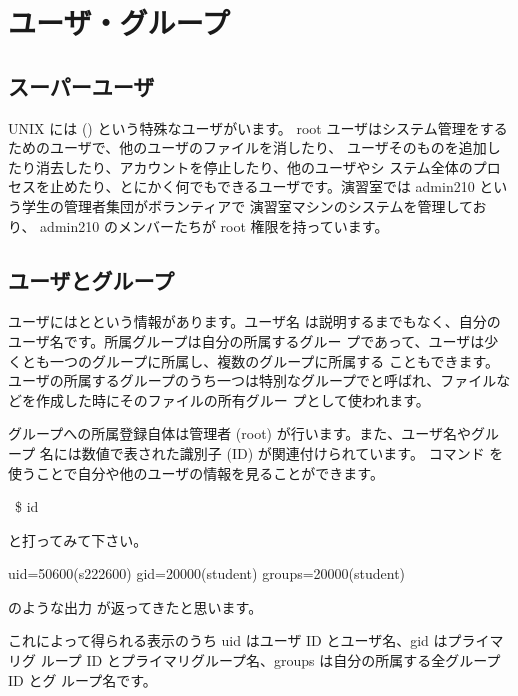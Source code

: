 \documentclass[platex]{jsarticle}
\begin{document}


%


\section{ユーザ・グループ}

 \subsection{スーパーユーザ}
 UNIX には  () という特殊なユーザがいます。
 root ユーザはシステム管理をするためのユーザで、他のユーザのファイルを消したり、
 ユーザそのものを追加したり消去したり、アカウントを停止したり、他のユーザやシ
 ステム全体のプロセスを止めたり、とにかく何でもできるユーザです。演習室では
 admin210 という学生の管理者集団がボランティアで 演習室マシンのシステムを管理しており、
 admin210 のメンバーたちが root 権限を持っています。

 \subsection{ユーザとグループ}
 ユーザにはとという情報があります。ユーザ名
 は説明するまでもなく、自分のユーザ名です。所属グループは自分の所属するグルー
 プであって、ユーザは少くとも一つのグループに所属し、複数のグループに所属する
 こともできます。ユーザの所属するグループのうち一つは特別なグループでと呼ばれ、ファイルなどを作成した時にそのファイルの所有グルー
 プとして使われます。

 グループへの所属登録自体は管理者 (root) が行います。また、ユーザ名やグループ
 名には数値で表された識別子 (ID) が関連付けられています。 コマンド
 を使うことで自分や他のユーザの情報を見ることができます。
 \begin{terminal}~\$ id\end{terminal}
 と打ってみて下さい。
 \begin{terminal}%
uid=50600(s222600) gid=20000(student) groups=20000(student)\end{terminal}
 のような出力
 が返ってきたと思います。

 これによって得られる表示のうち uid はユーザ ID とユーザ名、gid はプライマリグ
 ループ ID とプライマリグループ名、groups は自分の所属する全グループ ID とグ
 ループ名です。
\end{document}
